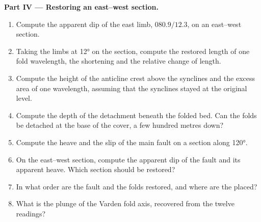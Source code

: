 \begin{problem}
\medskip\noindent\textbf{Part IV --- Restoring an east--west section.}
\begin{enumerate}[resume]
  \item Compute the apparent dip of the east limb, $080.9/12.3$, on an
        east--west section.
  \item Taking the limbs at \ang{12} on the section, compute the restored
        length of one fold wavelength, the shortening and the relative change
        of length.
  \item Compute the height of the anticline crest above the synclines and the
        excess area of one wavelength, assuming that the synclines stayed at
        the original level.
  \item Compute the depth of the detachment beneath the folded bed. Can the
        folds be detached at the base of the cover, a few hundred metres
        down?
  \item Compute the heave and the slip of the main fault on a section along
        \ang{120}.
  \item On the east--west section, compute the apparent dip of the fault and
        its apparent heave. Which section should be restored?
  \item In what order are the fault and the folds restored, and where are the
         placed?
  \item What is the plunge of the Varden fold axis, recovered from the twelve
        readings?
\end{enumerate}
\end{problem}
